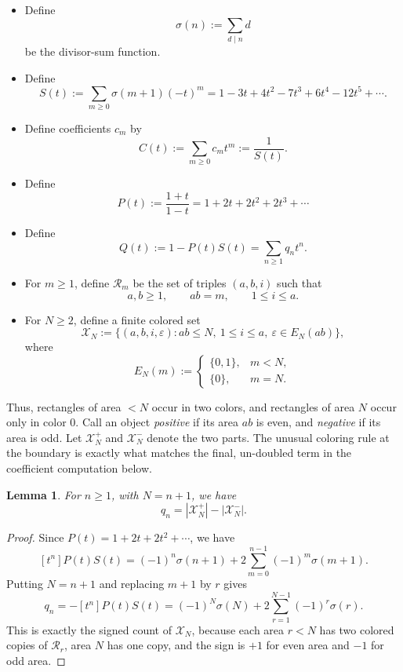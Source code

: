 \documentclass[11pt]{article}
\newtheorem{lemma}{Lemma}
\newcommand{\calR}{\mathcal{R}}
\newcommand{\calX}{\mathcal{X}}
\begin{document}
\begin{itemize}
\item Define
\[
  \sigma(n):=\sum_{d\mid n}d
\]
be the divisor-sum function.
\item Define
\[
  S(t):=\sum_{m\geq0}\sigma(m+1)(-t)^m
       =1-3t+4t^2-7t^3+6t^4-12t^5+\cdots.
\]
\item  Define coefficients $c_m$ by
\[
  C(t):=\sum_{m\geq0}c_m t^m:=\frac1{S(t)}.
\]
\item Define
\[
  P(t):=\frac{1+t}{1-t}=1+2t+2t^2+2t^3+\cdots
\]
\item Define
\[
  Q(t):=1-P(t)S(t)=\sum_{n\geq1}q_n t^n.
\]

\item For $m\geq1$, define $\calR_m$ be the set of triples $(a,b,i)$ such that
\[
  a,b\geq1,
  \qquad ab=m,
  \qquad 1\leq i\leq a.
\]

\item For $N\geq2$, define a finite colored set
\[
  \calX_N:=
  \{(a,b,i,\varepsilon):ab\leq N,
       \ 1\leq i\leq a,
       \ \varepsilon\in E_N(ab)\},
\]
where
\[
  E_N(m):=
  \begin{cases}
    \{0,1\},&m<N,\\
    \{0\},&m=N.
  \end{cases}
\]

\end{itemize}


Thus, rectangles of area $<N$ occur in two colors, and rectangles of area $N$ occur only in color $0$.  Call an object {\it positive} if its area $ab$ is even, and {\it negative} if its area is odd.  Let $\calX_N^+$ and $\calX_N^-$ denote the two parts.  The unusual coloring rule at the boundary is exactly what matches the final, un-doubled term in the coefficient computation below.

\begin{lemma}\label{lem:q-signed-count}
For $n\geq1$, with $N=n+1$, we have
\[
  q_n=|\calX_N^+|-|\calX_N^-|.
\]
\end{lemma}

\begin{proof}
Since $P(t)=1+2t+2t^2+\cdots$, we have
\[
  [t^n]P(t)S(t)
  =(-1)^n\sigma(n+1)+2\sum_{m=0}^{n-1}(-1)^m\sigma(m+1).
\]
Putting $N=n+1$ and replacing $m+1$ by $r$ gives
\[
  q_n=-[t^n]P(t)S(t)
      =(-1)^N\sigma(N)+2\sum_{r=1}^{N-1}(-1)^r\sigma(r).
\]
This is exactly the signed count of $\calX_N$, because each area $r<N$ has two colored copies of $\calR_r$, area $N$ has one copy, and the sign is $+1$ for even area and $-1$ for odd area.
\end{proof}
\end{document}
